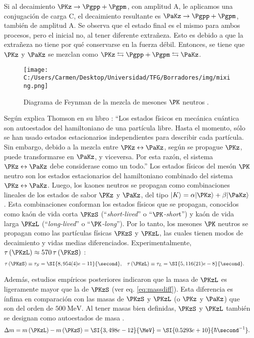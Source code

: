 Si al decaimiento $\PKz \rightarrow \Pgpp + \Pgpm$, con amplitud A, le aplicamos una conjugación de carga C, el decaimiento resultante es $\PaKz \rightarrow \Pgpp + \Pgpm$, también de amplitud A. Se observa que el estado final es el mismo para ambos procesos, pero el inicial no, al tener diferente extrañeza. Esto es debido a que la extrañeza no tiene por qué conservarse en la fuerza débil. Entonces, se tiene que $\PKz$ y $\PaKz$ se mezclan como $\PKz \leftrightarrows \Pgpp + \Pgpm \leftrightarrows \PaKz$.

\begin{figure}[!ht]
	\centering
	\texttt{[image: C:/Users/Carmen/Desktop/Universidad/TFG/Borradores/img/mixing.png]}
	\caption[Diagrama de Feynmann de la mezcla de mesones $\PK$ neutros]
	{Diagrama de Feynman de la mezcla de mesones $\PK$ neutros \cite{Thomson}.}
	\label{fig:kaonmix}
\end{figure}

Según explica Thomson en su libro \cite{Thomson}: ``Los estados físicos en mecánica cuántica son autoestados del hamiltoniano de una partícula libre. Hasta el momento, sólo se han usado estados estacionarios independientes para describir cada partícula. Sin embargo, debido a la mezcla entre $\PKz \leftrightarrow \PaKz$, según se propague $\PKz$, puede transformarse en $\PaKz$, y viceversa. Por esta razón, el sistema $\PKz \leftrightarrow \PaKz$ debe considerase como un todo.'' Los estados físicos del mesón $\PK$ neutro son los estados estacionarios del hamiltoniano combinado del sistema $\PKz \leftrightarrow \PaKz$. Luego, los kaones neutros se propagan como combinaciones lineales de los estados de sabor $\PKz$ y $\PaKz$, del tipo $|K\rangle=\alpha|\PKz\rangle+\beta|\PaKz\rangle$. Esta combinaciones conforman los estados físicos que se propagan, conocidos como kaón de vida corta $\PKzS$ (``\textit{short-lived}'' o ``\textit{$\PK$-shor}t'') y kaón de vida larga $\PKzL$ (``\textit{long-lived}'' o ``\textit{$\PK$-long}''). Por lo tanto, los mesones $\PK$ neutros se propagan como las partículas físicas $\PKzS$ y $\PKzL$, las cuales tienen modos de decaimiento y vidas medias diferenciados. Experimentalmente, $\tau\left(\PKzL\right) \approx 570\,\tau\left(\PKzS\right)$ \cite{Zyla}:
\begin{align}
\tau\left(\PKzS\right)\equiv \tau_{S} &= \SI{8,954(4)e-11}{\second}, & \tau\left(\PKzL\right)\equiv \tau_{L} &= \SI{5,116(21)e-8}{\second}.
\end{align}

Además, estudios empíricos posteriores indicaron que la masa de $\PKzL$ es ligeramente mayor que la de $\PKzS$ (ver eq. \ref{eq:massdiff}). Esta diferencia es ínfima en comparación con las masas de $\PKzS$ y $\PKzL$ (o $\PKz$ y $\PaKz$) que son del orden de $\SI{500}{\MeV}.$
Al tener masas bien definidas, $\PKzS$ y $\PKzL$ también se designan como autoestados de masa \cite{Thomson}.
\begin{equation}
\Delta m= m\left(\PKzL\right)-m\left(\PKzS\right)=\SI{3,498e-12}{\MeV}=\SI{0.5293e+10}{\hbar\second^{-1}}.\label{eq:massdiff}
\end{equation}


